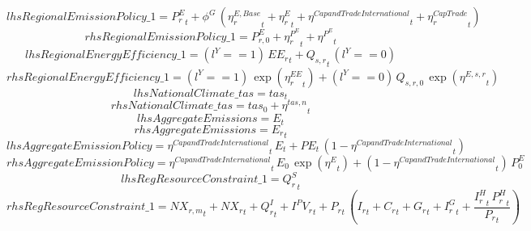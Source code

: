 \begin{dmath*}
lhsRegionalEmissionPolicy\_1 = {{P^E_r}}_{t}+{{\phi^{G}}}\, \left({{\eta^{E,Base}_r}}_{t}+{{\eta^{E}_r}}_{t}+{{\eta^{Cap and Trade International}}}_{t}+{{\eta^{CapTrade}_r}}_{t}\right)
\end{dmath*}
\begin{dmath*}
rhsRegionalEmissionPolicy\_1 = {{P^E_{r,0}}}+{{\eta^{P^E}_r}}_{t}+{{\eta^{P^E}}}_{t}
\end{dmath*}
\begin{dmath*}
lhsRegionalEnergyEfficiency\_1 = \left({{l^{Y}}}==1\right)\, {{EE_r}}_{t}+{{Q_{s,r}}}_{t}\, \left({{l^{Y}}}==0\right)
\end{dmath*}
\begin{dmath*}
rhsRegionalEnergyEfficiency\_1 = \left({{l^{Y}}}==1\right)\, \exp\left({{\eta^{EE}_r}}_{t}\right)+\left({{l^{Y}}}==0\right)\, {{Q_{s,r,0}}}\, \exp\left({{\eta^{E,s,r}}}_{t}\right)
\end{dmath*}
\begin{dmath*}
lhsNationalClimate\_tas = {{tas}}_{t}
\end{dmath*}
\begin{dmath*}
rhsNationalClimate\_tas = {{tas_{0}}}+{{\eta^{tas,n}}}_{t}
\end{dmath*}
\begin{dmath*}
lhsAggregateEmissions = {E}_{t}
\end{dmath*}
\begin{dmath*}
rhsAggregateEmissions = {{E_r}}_{t}
\end{dmath*}
\begin{dmath*}
lhsAggregateEmissionPolicy = {{\eta^{Cap and Trade International}}}_{t}\, {E}_{t}+{PE}_{t}\, \left(1-{{\eta^{Cap and Trade International}}}_{t}\right)
\end{dmath*}
\begin{dmath*}
rhsAggregateEmissionPolicy = {{\eta^{Cap and Trade International}}}_{t}\, {{E_0}}\, \exp\left({{\eta^{E}}}_{t}\right)+\left(1-{{\eta^{Cap and Trade International}}}_{t}\right)\, {{P^E_0}}
\end{dmath*}
\begin{dmath*}
lhsRegResourceConstraint\_1 = {{Q^S_r}}_{t}
\end{dmath*}
\begin{dmath*}
rhsRegResourceConstraint\_1 = {{NX_{r,m}}}_{t}+{{NX_r}}_{t}+{{Q^I_r}}_{t}+{{I^PV_r}}_{t}+{{P_{r}}}_{t}\, \left({{I_{r}}}_{t}+{{C_r}}_{t}+{{G_{r}}}_{t}+{{I^G_{r}}}_{t}+\frac{{{I^H_r}}_{t}\, {{P^H_r}}_{t}}{{{P_{r}}}_{t}}\right)
\end{dmath*}
